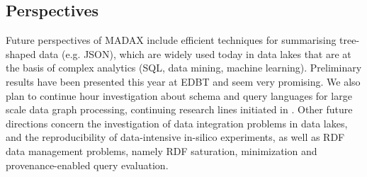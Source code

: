 %
%
%
%
%
%

\subsection{Perspectives}

Future perspectives of MADAX include efficient techniques for summarising tree-shaped data (e.g. JSON), which are widely used today in data lakes that are at the basis of complex analytics (SQL, data mining, machine learning). Preliminary results have been presented this year at EDBT \cite{DBLP:conf/edbt/BaaziziLCGS17} and seem very promising. We also  plan to  continue  hour investigation  about  schema and query languages for  large scale data graph processing, continuing research lines initiated in  \cite{DBLP:conf/dbpl/ColazzoS15}.  Other future directions concern  the  investigation of data integration problems in data lakes, and the reproducibility of data-intensive in-silico experiments, as well as  RDF data management problems, namely RDF saturation, minimization and provenance-enabled query evaluation.


